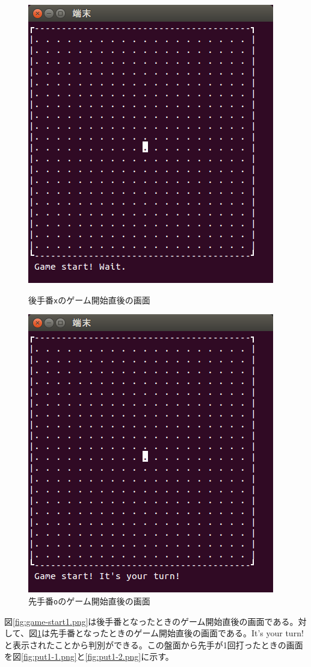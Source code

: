 \documentclass[a4j, titlepage, 10pt]{jsarticle}
\newcommand{\code}[1]{\texttt{#1}}
\begin{document}
\begin{figure}[H]
  \begin{minipage}{0.5\hsize}
    \centering
    \includegraphics[scale=0.5]{img/game-start1.png}
    \caption{後手番\code{x}のゲーム開始直後の画面}
    \label{fig:game-start1.png}
  \end{minipage}
  \begin{minipage}{0.5\hsize}
    \includegraphics[scale=0.5]{img/game-start2.png}
    \caption{先手番\code{o}のゲーム開始直後の画面}
    \label{fig:game-start2.png}
  \end{minipage}
\end{figure}
図\ref{fig:game-start1.png}は後手番となったときのゲーム開始直後の画面である。対して、図\ref{fig:game-start2.png}は先手番となったときのゲーム開始直後の画面である。{\ttfamily It's your turn!}と表示されたことから判別ができる。この盤面から先手が1回打ったときの画面を図\ref{fig:put1-1.png}と\ref{fig:put1-2.png}に示す。
\end{document}
